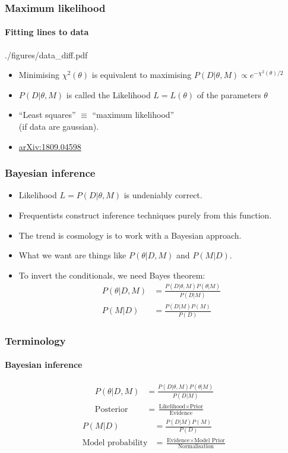 \documentclass[%
]{beamer}
\begin{document}
\begin{frame}
    \frametitle{Maximum likelihood}
    \framesubtitle{Fitting lines to data}
    \begin{figleft}[0.6]{./figures/data_diff.pdf}
        \begin{itemize}
            \item Minimising $\chi^2(\theta)$  is equivalent to maximising $P(D|\theta,M) \propto e^{-\chi^2(\theta)/2}$
            \item $P(D|\theta,M)$ is called the Likelihood $L=L(\theta)$ of the parameters $\theta$
            \item ``Least squares'' $\equiv$ ``maximum likelihood'' \\(if data are gaussian).
            \item \href{https://arxiv.org/abs/1809.04598}{arXiv:1809.04598}
        \end{itemize}
    \end{figleft}
\end{frame}

\begin{frame}
    \frametitle{Bayesian inference}
    \begin{itemize}
        \item Likelihood $L=P(D|\theta,M)$ is undeniably correct.
        \item Frequentists construct inference techniques purely from this function.
        \item The trend is cosmology is to work with a Bayesian approach.
        \item What we want are things like $P(\theta|D,M)$ and $P(M|D)$.
        \item To invert the conditionals, we need Bayes theorem:
            \begin{align}
                P(\theta|D,M) &= \frac{P(D|\theta,M) P(\theta|M)}{P(D|M)} \nonumber\\
                P(M|D) &= \frac{P(D|M) P(M)}{P(D)} \nonumber
            \end{align}
    \end{itemize}
\end{frame}

\begin{frame}
    \frametitle{Terminology}
    \framesubtitle{Bayesian inference}
    \begin{align}
        P(\theta|D,M) &= \frac{P(D|\theta,M) P(\theta|M)}{P(D|M)} \nonumber\\
        \text{Posterior} &= \frac{\text{Likelihood}\times\text{Prior}}{\text{Evidence}} \nonumber
    \end{align}
    \begin{align}
        P(M|D) &= \frac{P(D|M) P(M)}{P(D)} \nonumber\\
        \text{Model probability} &= \frac{\text{Evidence}\times\text{Model Prior}}{\text{Normalisation}} \nonumber
    \end{align}
\end{frame}
\end{document}
